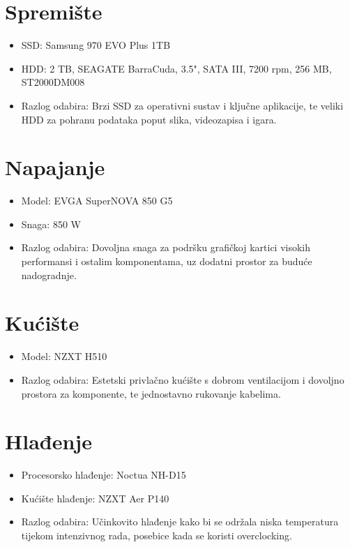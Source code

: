 \documentclass{article}
\begin{document}
\section{Spremište}
\begin{itemize}[label=--]
  \item SSD: Samsung 970 EVO Plus 1TB
  \item HDD: 2 TB, SEAGATE BarraCuda, 3.5", SATA III, 7200 rpm, 256 MB, ST2000DM008
  \item Razlog odabira: Brzi SSD za operativni sustav i ključne aplikacije, te veliki HDD za pohranu podataka poput slika, videozapisa i igara.
\end{itemize}

\section{Napajanje}
\begin{itemize}[label=--]
  \item Model: EVGA SuperNOVA 850 G5
  \item Snaga: 850 W
  \item Razlog odabira: Dovoljna snaga za podršku grafičkoj kartici visokih performansi i ostalim komponentama, uz dodatni prostor za buduće nadogradnje.
\end{itemize}

\section{Kućište}
\begin{itemize}[label=--]
  \item Model: NZXT H510
  \item Razlog odabira: Estetski privlačno kućište s dobrom ventilacijom i dovoljno prostora za komponente, te jednostavno rukovanje kabelima.
\end{itemize}

\section{Hlađenje}
\begin{itemize}[label=--]
  \item Procesorsko hlađenje: Noctua NH-D15
  \item Kućište hlađenje: NZXT Aer P140
  \item Razlog odabira: Učinkovito hlađenje kako bi se održala niska temperatura tijekom intenzivnog rada, posebice kada se koristi overclocking.
\end{itemize}
\newpage
\end{document}
